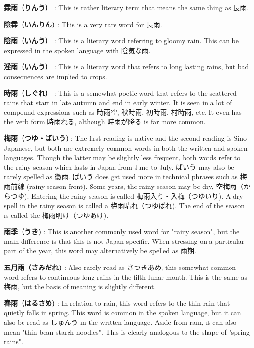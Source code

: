 \par{\textbf{霖雨（りんう） }: This is rather literary term that means the same thing as 長雨. }

\par{\textbf{陰霖（いんりん) }: This is a very rare word for 長雨. }

\par{\textbf{陰雨（いんう） }: This is a literary word referring to gloomy rain. This can be expressed in the spoken language with 陰気な雨. }

\par{\textbf{淫雨（いんう） }: This is a literary word that refers to long lasting rains, but bad consequences are implied to crops. }

\par{\textbf{時雨（しぐれ） }: This is a somewhat poetic word that refers to the scattered rains that start in late autumn and end in early winter. It is seen in a lot of compound expressions such as 時雨空, 秋時雨, 初時雨, 村時雨, etc. It even has the verb form 時雨れる, although 時雨が降る is far more common. }

\par{\textbf{梅雨（つゆ・ばいう) }: The first reading is native and the second reading is Sino-Japanese, but both are extremely common words in both the written and spoken languages. Though the latter may be slightly less frequent, both words refer to the rainy season which lasts in Japan from June to July. ばいう may also be rarely spelled as 黴雨. ばいう does get used more in technical phrases such as 梅雨前線 (rainy season front). Some years, the rainy season may be dry, 空梅雨（からつゆ). Entering the rainy season is called 梅雨入り・入梅（つゆいり). A dry spell in the rainy season is called a 梅雨晴れ（つゆばれ). The end of the season is called the 梅雨明け（つゆあけ). }

\par{\textbf{雨季（うき) }: This is another commonly used word for "rainy season", but the main difference is that this is not Japan-specific. When stressing on a particular part of the year, this word may alternatively be spelled as 雨期. }

\par{\textbf{五月雨（さみだれ) }: Also rarely read as さつきあめ, this somewhat common word refers to continuous long rains in the fifth lunar month. This is the same as 梅雨, but the basis of meaning is slightly different. }

\par{\textbf{春雨（はるさめ) }: In relation to rain, this word refers to the thin rain that quietly falls in spring. This word is common in the spoken language, but it can also be read as しゅんう in the written language. Aside from rain, it can also mean "thin bean starch noodles". This is clearly analogous to the shape of "spring rains". }

